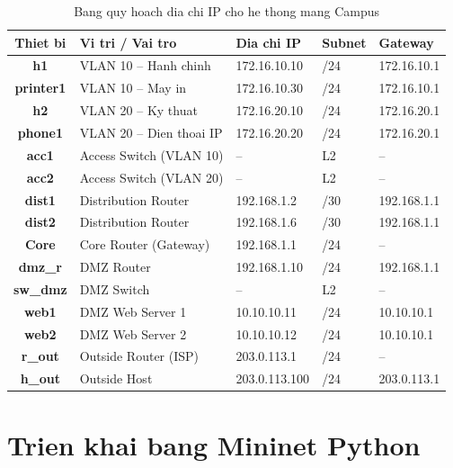 \begin{table}[H]
\centering
\caption{Bang quy hoach dia chi IP cho he thong mang Campus}
\vspace{0.3cm}
\begin{tabularx}{\textwidth}{|c|>{\raggedright\arraybackslash}X|l|l|l|}
    \hline
    \textbf{Thiet bi} & \textbf{Vi tri / Vai tro} & \textbf{Dia chi IP} & \textbf{Subnet} & \textbf{Gateway} \\ \hline
    \textbf{h1} & VLAN 10 -- Hanh chinh & 172.16.10.10 & /24 & 172.16.10.1 \\ \hline
    \textbf{printer1} & VLAN 10 -- May in & 172.16.10.30 & /24 & 172.16.10.1 \\ \hline
    \textbf{h2} & VLAN 20 -- Ky thuat & 172.16.20.10 & /24 & 172.16.20.1 \\ \hline
    \textbf{phone1} & VLAN 20 -- Dien thoai IP & 172.16.20.20 & /24 & 172.16.20.1 \\ \hline
    \textbf{acc1} & Access Switch (VLAN 10) & -- & L2 & -- \\ \hline
    \textbf{acc2} & Access Switch (VLAN 20) & -- & L2 & -- \\ \hline
    \textbf{dist1} & Distribution Router & 192.168.1.2 & /30 & 192.168.1.1 \\ \hline
    \textbf{dist2} & Distribution Router & 192.168.1.6 & /30 & 192.168.1.1 \\ \hline
    \textbf{Core} & Core Router (Gateway) & 192.168.1.1 & /24 & -- \\ \hline
    \textbf{dmz\_r} & DMZ Router & 192.168.1.10 & /24 & 192.168.1.1 \\ \hline
    \textbf{sw\_dmz} & DMZ Switch & -- & L2 & -- \\ \hline
    \textbf{web1} & DMZ Web Server 1 & 10.10.10.11 & /24 & 10.10.10.1 \\ \hline
    \textbf{web2} & DMZ Web Server 2 & 10.10.10.12 & /24 & 10.10.10.1 \\ \hline
    \textbf{r\_out} & Outside Router (ISP) & 203.0.113.1 & /24 & -- \\ \hline
    \textbf{h\_out} & Outside Host & 203.0.113.100 & /24 & 203.0.113.1 \\ \hline
\end{tabularx}
\label{tab:ip_plan}
\end{table}

\section{Trien khai bang Mininet Python}

